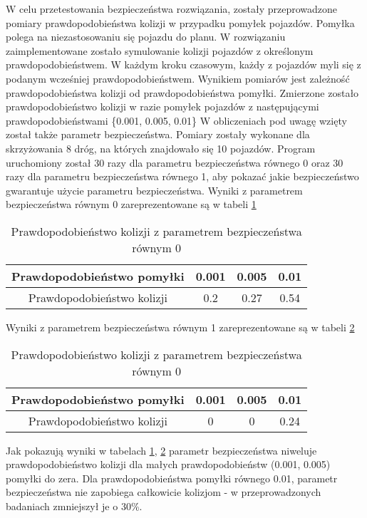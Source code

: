 W celu przetestowania bezpieczeństwa rozwiązania, zostały przeprowadzone pomiary prawdopodobieństwa kolizji w przypadku pomyłek pojazdów. Pomyłka polega na niezastosowaniu się pojazdu do planu. W rozwiązaniu zaimplementowane zostało symulowanie kolizji pojazdów z określonym prawdopodobieństwem. W każdym kroku czasowym, każdy z pojazdów myli się z podanym wcześniej prawdopodobieństwem. Wynikiem pomiarów jest zależność prawdopodobieństwa kolizji od prawdopodobieństwa pomyłki. Zmierzone zostało prawdopodobieństwo kolizji w razie pomyłek pojazdów z następującymi prawdopodobieństwami \{0.001, 0.005, 0.01\}
\newline
\indent
W obliczeniach pod uwagę wzięty został także parametr bezpieczeństwa. Pomiary zostały wykonane dla skrzyżowania 8 dróg, na których znajdowało się 10 pojazdów. Program uruchomiony został 30 razy dla parametru bezpieczeństwa równego 0 oraz 30 razy dla parametru bezpieczeństwa równego 1, aby pokazać jakie bezpieczeństwo gwarantuje użycie parametru bezpieczeństwa.
\newline
\newline
Wyniki z parametrem bezpieczeństwa równym 0 zareprezentowane są w tabeli \ref{firstCollision}
\begin{table}[H]
    \centering
    \begin{tabular}{|c|c|c|c|}
      \hline 
      Prawdopodobieństwo pomyłki & 0.001 & 0.005 & 0.01 \\
      \hline
      Prawdopodobieństwo kolizji & 0.2 & 0.27 & 0.54 \\
      \hline
    \end{tabular} 
    \caption{Prawdopodobieństwo kolizji z parametrem bezpieczeństwa równym 0}
    \label{firstCollision}
\end{table}
\noindent
Wyniki z parametrem bezpieczeństwa równym 1 zareprezentowane są w tabeli \ref{secondCollision}
\begin{table}[H]
    \centering
    \begin{tabular}{|c|c|c|c|}
      \hline 
      Prawdopodobieństwo pomyłki & 0.001 & 0.005 & 0.01 \\
      \hline
      Prawdopodobieństwo kolizji & 0 & 0 & 0.24 \\
      \hline
    \end{tabular} 
    \caption{Prawdopodobieństwo kolizji z parametrem bezpieczeństwa równym 0}
    \label{secondCollision}
\end{table}
Jak pokazują wyniki w tabelach \ref{firstCollision}, \ref{secondCollision} parametr bezpieczeństwa niweluje prawdopodobieństwo kolizji dla małych prawdopodobieństw (0.001, 0.005) pomyłki do zera. Dla prawdopodobieństwa pomyłki równego 0.01, parametr bezpieczeństwa nie zapobiega całkowicie kolizjom - w przeprowadzonych badaniach zmniejszył je o 30\%.

